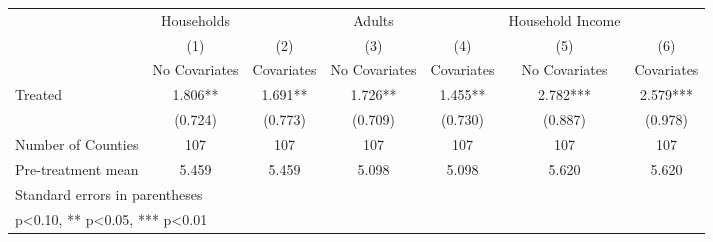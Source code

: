 {
\def\sym#1{\ifmmode^{#1}\else\(^{#1}\)\fi}
\begin{tabular}{l*{6}{c}}
\hline\hline
            &  Households   &               &      Adults   &               &Household Income   &               \\
            &\multicolumn{1}{c}{(1)}&\multicolumn{1}{c}{(2)}&\multicolumn{1}{c}{(3)}&\multicolumn{1}{c}{(4)}&\multicolumn{1}{c}{(5)}&\multicolumn{1}{c}{(6)}\\
            &\multicolumn{1}{c}{No Covariates}&\multicolumn{1}{c}{Covariates}&\multicolumn{1}{c}{No Covariates}&\multicolumn{1}{c}{Covariates}&\multicolumn{1}{c}{No Covariates}&\multicolumn{1}{c}{Covariates}\\
\hline
Treated     &       1.806** &       1.691** &       1.726** &       1.455** &       2.782***&       2.579***\\
            &     (0.724)   &     (0.773)   &     (0.709)   &     (0.730)   &     (0.887)   &     (0.978)   \\
\hline
Number of Counties&         107   &         107   &         107   &         107   &         107   &         107   \\
Pre-treatment mean&       5.459   &       5.459   &       5.098   &       5.098   &       5.620   &       5.620   \\
\hline\hline
\multicolumn{7}{l}{\footnotesize Standard errors in parentheses}\\
\multicolumn{7}{l}{\footnotesize * p<0.10, ** p<0.05, *** p<0.01}\\
\end{tabular}
}

